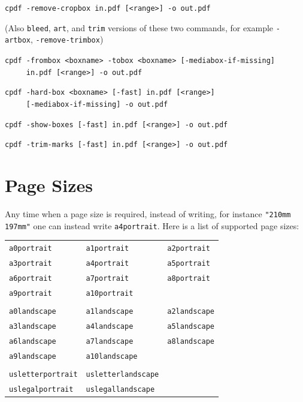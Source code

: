 \documentclass{book}
\newcommand{\smallgap}{\bigskip}
\begin{document}
\begin{framed}
  \vspace{1.5mm}
  \small\noindent\verb!cpdf -remove-cropbox in.pdf [<range>] -o out.pdf!

  \vspace{1.5mm}
  (Also \texttt{bleed}, \texttt{art}, and \texttt{trim} versions of these two commands, for example  \texttt{-artbox}, \texttt{-remove-trimbox})

  \vspace{1.5mm}
  \small\noindent\verb!cpdf -frombox <boxname> -tobox <boxname> [-mediabox-if-missing]! \\
  \noindent\verb!     in.pdf [<range>] -o out.pdf!

  \vspace{1.5mm}
  \small\noindent\verb!cpdf -hard-box <boxname> [-fast] in.pdf [<range>]!\\
  \small\noindent\verb!     [-mediabox-if-missing] -o out.pdf!

  \vspace{1.5mm}
  \small\noindent\verb!cpdf -show-boxes [-fast] in.pdf [<range>] -o out.pdf!

  \vspace{1.5mm}
  \small\noindent\verb!cpdf -trim-marks [-fast] in.pdf [<range>] -o out.pdf!

  \end{framed}

  \section{Page Sizes}
\label{papersizes}
  Any time when a page size is required, instead of writing, for instance \texttt{"210mm 197mm"} one can instead write \texttt{a4portrait}. Here is a list of supported page sizes:

{\small
  \smallgap
  \begin{tabular}{lll}
  \texttt{a0portrait} & \texttt{a1portrait} & \texttt{a2portrait} \\
  \texttt{a3portrait} & \texttt{a4portrait} & \texttt{a5portrait} \\
  \texttt{a6portrait} & \texttt{a7portrait} & \texttt{a8portrait} \\
  \texttt{a9portrait} & \texttt{a10portrait} & \\
  \\
  \texttt{a0landscape} & \texttt{a1landscape} & \texttt{a2landscape} \\
  \texttt{a3landscape} & \texttt{a4landscape} & \texttt{a5landscape} \\
  \texttt{a6landscape} & \texttt{a7landscape} & \texttt{a8landscape} \\
  \texttt{a9landscape} & \texttt{a10landscape} & \\
  \\
  \texttt{usletterportrait} & \texttt{usletterlandscape} & \\
  \texttt{uslegalportrait} & \texttt{uslegallandscape} &
  \end{tabular}
}
\bigskip
\end{document}
